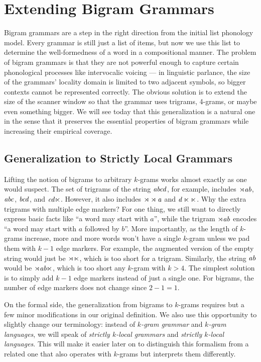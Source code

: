 \chapter{Extending Bigram Grammars}
\label{cha:SLMath}

Bigram grammars are a step in the right direction from the initial list phonology model.
Every grammar is still just a list of items, but now we use this list to determine the well-formedness of a word in a compositional manner.
The problem of bigram grammars is that they are not powerful enough to capture certain phonological processes like intervocalic voicing --- in linguistic parlance, the size of the grammars' locality domain is limited to two adjacent symbols, so bigger contexts cannot be represented correctly.
The obvious solution is to extend the size of the scanner window so that the grammar uses trigrams, 4-grams, or maybe even something bigger.
We will see today that this generalization is a natural one in the sense that it preserves the essential properties of bigram grammars while increasing their empirical coverage.

\section{Generalization to Strictly Local Grammars}

Lifting the notion of bigrams to arbitrary $k$-grams works almost exactly as one would suspect.
The set of trigrams of the string $\mathit{abcd}$, for example, includes $\mathit{\rtimes a b}$, $\mathit{abc}$, $\mathit{bcd}$, and $\mathit{cd\ltimes}$.
However, it also includes $\mathit{\rtimes \rtimes a}$ and $\mathit{d \ltimes \ltimes}$.
Why the extra trigrams with multiple edge markers?
For one thing, we still want to directly express basic facts like ``a word may start with $a$'', while the trigram $\mathit{\rtimes a b}$ encodes ``a word may start with $a$ followed by $b$''.
More importantly, as the length of $k$-grams increase, more and more words won't have a single $k$-gram unless we pad them with $k-1$ edge markers.
For example, the augmented version of the empty string would just be $\rtimes \ltimes$, which is too short for a trigram.
Similarly, the string $\mathit{ab}$ would be $\mathit{\rtimes ab \ltimes}$, which is too short any $k$-gram with $k > 4$.
The simplest solution is to simply add $k-1$ edge markers instead of just a single one.
For bigrams, the number of edge markers does not change since $2 - 1 = 1$.

On the formal side, the generalization from bigrams to $k$-grams requires but a few minor modifications in our original definition.
We also use this opportunity to slightly change our terminology: instead of \emph{$k$-gram grammar} and \emph{$k$-gram languages}, we will speak of \emph{strictly $k$-local grammars} and \emph{strictly $k$-local languages}.
This will make it easier later on to distinguish this formalism from a related one that also operates with $k$-grams but interprets them differently.

